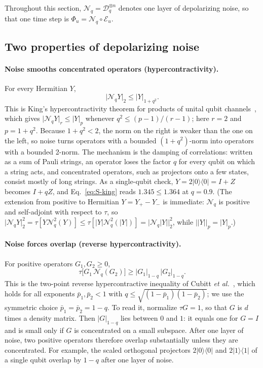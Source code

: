 \documentclass[aps,prl,twocolumn,superscriptaddress,floatfix]{revtex4-2}
\theoremstyle{plain}
\newcommand{\ketbra}[2]{|#1\rangle\!\langle #2|}
\newcommand{\nrm}[2]{\lvert #1\rvert_{#2}}
\newcommand{\cD}{\mathcal D}
\newcommand{\cE}{\mathcal E}
\newcommand{\Nq}{\mathcal N_q}
\begin{document}
Throughout this section, $\Nq=\cD_q^{\otimes n}$ denotes one layer of depolarizing noise, so that one time step is $\Phi_u=\Nq\circ\cE_u$.

\subsection{Two properties of depolarizing noise}
\label{sm:ineq}

\paragraph*{Noise smooths concentrated operators (hypercontractivity).} For every Hermitian $Y$,
\begin{equation}
\nrm{\Nq Y}2\le\nrm Y{1+q^2} .
\label{eq:S-king}
\end{equation}
This is King's hypercontractivity theorem for products of unital qubit channels~\cite[Corollary~2]{King2014}, which gives $\nrm{\Nq Y}r\le\nrm Yp$ whenever $q^2\le(p-1)/(r-1)$; here $r=2$ and $p=1+q^2$. Because $1+q^2<2$, the norm on the right is weaker than the one on the left, so noise turns operators with a bounded $(1+q^2)$-norm into operators with a bounded 2-norm. The mechanism is the damping of correlations: written as a sum of Pauli strings, an operator loses the factor $q$ for every qubit on which a string acts, and concentrated operators, such as projectors onto a few states, consist mostly of long strings. As a single-qubit check, $Y=2\ketbra00=I+Z$ becomes $I+qZ$, and Eq.~\eqref{eq:S-king} reads $1.345\le1.364$ at $q=0.9$. (The extension from positive to Hermitian $Y=Y_+-Y_-$ is immediate: $\Nq$ is positive and self-adjoint with respect to $\tau$, so $\nrm{\Nq Y}2^2=\tau[Y\Nq^2(Y)]\le\tau[|Y|\Nq^2(|Y|)]=\nrm{\Nq|Y|}2^2$, while $\nrm{|Y|}p=\nrm Yp$.)

\paragraph*{Noise forces overlap (reverse hypercontractivity).} For positive operators $G_1,G_2\ge0$,
\begin{equation}
\tau\bigl[G_1\,\Nq(G_2)\bigr]\ge\nrm{G_1}{1-q}\,\nrm{G_2}{1-q} .
\label{eq:S-cubitt}
\end{equation}
This is the two-point reverse hypercontractive inequality of Cubitt \emph{et al.}~\cite[Corollary~14]{Cubitt2015}, which holds for all exponents $\bar p_1,\bar p_2<1$ with $q\le\sqrt{(1-\bar p_1)(1-\bar p_2)}$; we use the symmetric choice $\bar p_1=\bar p_2=1-q$. To read it, normalize $\tau G=1$, so that $G$ is $d$ times a density matrix. Then $\nrm G{1-q}$ lies between $0$ and $1$: it equals one for $G=I$ and is small only if $G$ is concentrated on a small subspace. After one layer of noise, two positive operators therefore overlap substantially unless they are concentrated. For example, the scaled orthogonal projectors $2\ketbra00$ and $2\ketbra11$ of a single qubit overlap by $1-q$ after one layer of noise.
\end{document}
